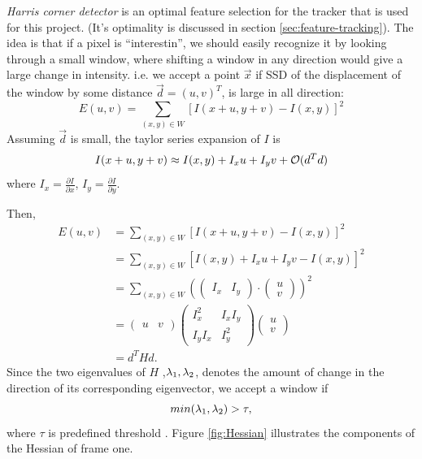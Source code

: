 \emph{Harris corner detector} is an optimal feature selection for the
tracker that is used for this project. (It's optimality is discussed
in section \ref{sec:feature-tracking}). The idea is that if a pixel is
``interestin'', we should easily recognize it by looking through a
small window, where shifting a window in any direction
would give a large change in intensity. i.e. we accept a point $\vec x$ if SSD of
the displacement of the window by some distance $\vec d=(u,v)^T$, is large in all
direction:$$E(u,v) =\sum_{(x,y)\in W} [I(x+u, y+v) - I(x,y)]^2$$ 
Assuming $\vec d$ is small, the taylor series expansion of $I$ is
$$I(x+u, y+v) \approx I(x,y) + I_xu +I_yv + \mathcal{O}(d^Td)$$ where $I_x
=\frac{\partial I}{\partial x} $, $I_y = \frac{\partial I}{\partial y}$.

Then, 
\begin{align*}
  E(u,v) &=\sum_{(x,y)\in W} [I(x+u, y+v) - I(x,y)]^2\\
&=\sum_{(x,y)\in W} [I(x,y) + I_xu +
I_yv - I(x,y)]^2\\
&= \sum_{(x,y)\in W} (
\begin{pmatrix}
  I_x & I_y
\end{pmatrix}
\cdot
\begin{pmatrix}
  u \\ v
\end{pmatrix}
)^2\\
&= \begin{pmatrix}
  u & v
\end{pmatrix} 
\begin{pmatrix}  I_x^2
  & I_xI_y \\ I_yI_x & I_y^2\end{pmatrix} \begin{pmatrix}
  u \\ v
\end{pmatrix}\\
&=d^T H d.
\end{align*}
  Since the two eigenvalues of $H$
,$\lambda_1, \lambda_2$, denotes the amount of change in the direction of its corresponding
eigenvector, we accept a window if $$min(\lambda_1, \lambda_2) > \tau,$$ where
$\tau$ is predefined threshold \cite{shi}. Figure \ref{fig:Hessian} illustrates
the components of the Hessian of frame one. 

